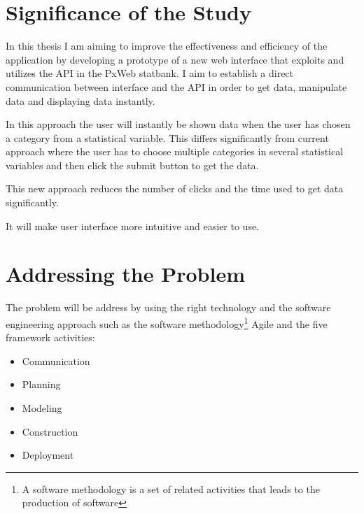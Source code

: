 \section{Significance of the Study}
In this thesis I am aiming to improve the effectiveness and efficiency of the application by developing a prototype of a new web interface that exploits and utilizes the API in the PxWeb statbank. I aim to establish a direct communication between interface and the API in order to get data, manipulate data and displaying data instantly.

In this approach the user will instantly be shown data when the user has chosen a category from a statistical variable. This differs significantly from current approach where the user has to choose multiple categories in several statistical variables and then click the submit button to get the data. 

This new approach reduces the number of clicks and the time used to get data significantly.

It will make user interface more intuitive and easier to use.
 
\section{Addressing the Problem}
The problem will be address by using the right technology and the software engineering approach such as the software methodology\footnote{A software methodology is a set of related activities that leads to the production of software} Agile and the five framework activities:

\begin{itemize}
    \item Communication
    \item Planning
    \item Modeling
    \item Construction
    \item Deployment
\end{itemize}
